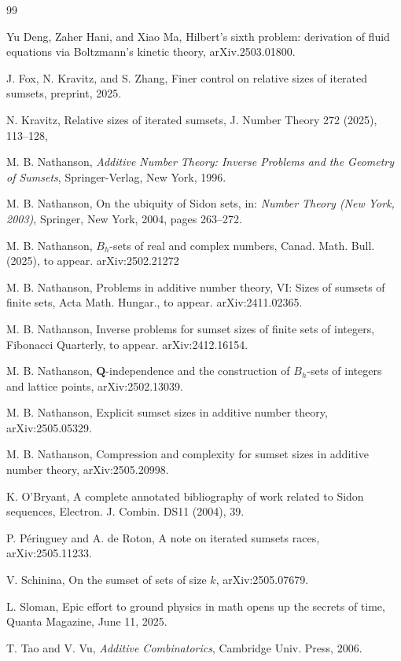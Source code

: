 \documentclass{amsart}
\begin{document}
\begin{thebibliography}{99}

Yu Deng,  Zaher Hani, and Xiao Ma, 
Hilbert's sixth problem: derivation of fluid equations via Boltzmann's kinetic theory, 
arXiv.2503.01800.

J. Fox, N. Kravitz, and S. Zhang,
Finer control on relative sizes of iterated sumsets,
preprint, 2025. 


N. Kravitz, Relative sizes of iterated sumsets, 
J. Number Theory 272 (2025), 113--128, 



M. B. Nathanson, 
\emph{Additive Number Theory: Inverse Problems and the Geometry of 
Sumsets}, Springer-Verlag, New York, 1996. 

M.  B. Nathanson, On the ubiquity of Sidon sets, 
in: \emph{Number Theory (New York, 2003)},
Springer, New York, 2004, pages 263--272.

M.  B. Nathanson, $B_h$-sets of real and complex numbers, 
Canad. Math. Bull.  (2025),  to appear.
arXiv:2502.21272  


M.  B. Nathanson, Problems in additive number theory, VI:  
Sizes of sumsets of finite sets, Acta Math. Hungar., to appear.
arXiv:2411.02365.



M.  B. Nathanson, Inverse problems for sumset sizes of finite sets of integers, 
Fibonacci Quarterly, to appear. 
arXiv:2412.16154. 

M.  B. Nathanson,
${\mathbf Q}$-independence and the construction  of $B_h$-sets 
of integers and lattice points, 
arXiv:2502.13039.

M.  B. Nathanson, Explicit sumset sizes in additive number theory, 
arXiv:2505.05329. 


M.  B. Nathanson, Compression and complexity for sumset sizes 
 in additive number theory, arXiv:2505.20998.

K. O'Bryant, A complete annotated bibliography of work related to
  {S}idon sequences, Electron. J. Combin. DS11  (2004), 39.



P.  P\' eringuey and A. de Roton, 
A note on iterated sumsets races,
arXiv:2505.11233. 

V. Schinina, On the sumset  of sets of size $k$, 
arXiv:2505.07679. 

L. Sloman, Epic effort to ground physics in math opens up the secrets of time, 
Quanta Magazine, June 11, 2025.

T. Tao and V. Vu, \emph{Additive Combinatorics}, 
Cambridge Univ. Press, 2006.




\end{thebibliography}
\end{document}
